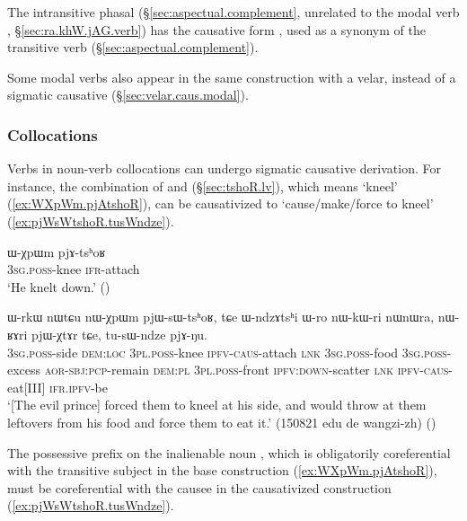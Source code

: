 The intransitive phasal  (§\ref{sec:aspectual.complement}, unrelated to the modal verb , §\ref{sec:ra.khW.jAG.verb}) has the causative form , used as a synonym of the transitive verb  (§\ref{sec:aspectual.complement}).

Some modal verbs also appear in the same construction with a velar, instead of a sigmatic causative (§\ref{sec:velar.caus.modal}).

\subsubsection{Collocations} \label{sec:sig.caus.collocations}
Verbs in noun-verb collocations can undergo sigmatic causative derivation. For instance, the combination of  and  (§\ref{sec:tshoR.lv}), which means `kneel' (\ref{ex:WXpWm.pjAtshoR}), can be causativized to  `cause/make/force to kneel' (\ref{ex:pjWsWtshoR.tusWndze}).

\begin{exe}
\ex \label{ex:WXpWm.pjAtshoR}
\gll ɯ-χpɯm pjɤ-tsʰoʁ \\
\textsc{3sg}.\textsc{poss}-knee \textsc{ifr}-attach \\
\glt `He knelt down.' ()
\end{exe}

\begin{exe}
\ex \label{ex:pjWsWtshoR.tusWndze}
\gll ɯ-rkɯ nɯtɕu nɯ-χpɯm pjɯ-sɯ-tsʰoʁ, tɕe ɯ-ndzɤtsʰi ɯ-ro nɯ-kɯ-ri nɯnɯra, nɯ-ʁɤri pjɯ-χtɤr tɕe, tu-sɯ-ndze pjɤ-ŋu. \\
\textsc{3sg}.\textsc{poss}-side \textsc{dem}:\textsc{loc} \textsc{3pl}.\textsc{poss}-knee \textsc{ipfv}-\textsc{caus}-attach \textsc{lnk} \textsc{3sg}.\textsc{poss}-food \textsc{3sg}.\textsc{poss}-excess \textsc{aor}-\textsc{sbj}:\textsc{pcp}-remain \textsc{dem}:\textsc{pl} \textsc{3pl}.\textsc{poss}-front \textsc{ipfv}:\textsc{down}-scatter \textsc{lnk} \textsc{ipfv}-\textsc{caus}-eat[III] \textsc{ifr}.\textsc{ipfv}-be \\
\glt `[The evil prince] forced them to kneel at his side, and would throw at them leftovers from his food and force them to eat it.' (150821 edu de wangzi-zh)
()
\end{exe}

The possessive prefix on the inalienable noun , which is obligatorily coreferential with the transitive subject in the base construction (\ref{ex:WXpWm.pjAtshoR}), must be coreferential with the causee in the causativized construction (\ref{ex:pjWsWtshoR.tusWndze}).

